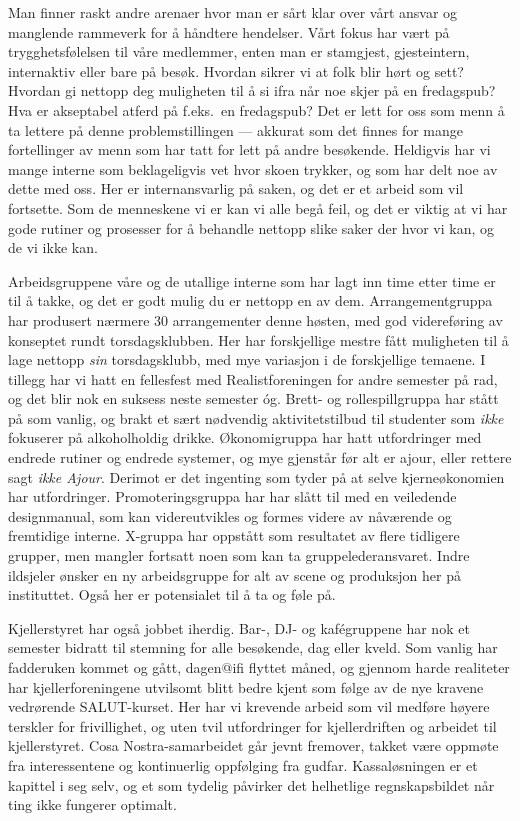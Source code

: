 \documentclass[10pt,norsk,a4paper]{article}
\begin{document}
\begin{multicols}{2}
Man finner raskt andre arenaer hvor man er sårt klar over vårt ansvar og manglende rammeverk for å håndtere hendelser. Vårt fokus har vært på trygghetsfølelsen til våre medlemmer, enten man er stamgjest, gjesteintern, internaktiv eller bare på besøk. Hvordan sikrer vi at folk blir hørt og sett? Hvordan gi nettopp deg muligheten til å si ifra når noe skjer på en fredagspub? Hva er akseptabel atferd på f.eks.\ en fredagspub? Det er lett for oss som menn å ta lettere på denne problemstillingen --- akkurat som det finnes for mange fortellinger av menn som har tatt for lett på andre besøkende. Heldigvis har vi mange interne som beklageligvis vet hvor skoen trykker, og som har delt noe av dette med oss. Her er internansvarlig på saken, og det er et arbeid som vil fortsette. Som de menneskene vi er kan vi alle begå feil, og det er viktig at vi har gode rutiner og prosesser for å behandle nettopp slike saker der hvor vi kan, og de vi ikke kan.

Arbeidsgruppene våre og de utallige interne som har lagt inn time etter time er til å takke, og det er godt mulig du er nettopp en av dem. Arrangementgruppa har produsert nærmere 30 arrangementer denne høsten, med god videreføring av konseptet rundt torsdagsklubben. Her har forskjellige mestre fått muligheten til å lage nettopp \textit{sin} torsdagsklubb, med mye variasjon i de forskjellige temaene. I tillegg har vi hatt en fellesfest med Realistforeningen for andre semester på rad, og det blir nok en suksess neste semester óg. Brett- og rollespillgruppa har stått på som vanlig, og brakt et sært nødvendig aktivitetstilbud til studenter som \textit{ikke} fokuserer på alkoholholdig drikke. Økonomigruppa har hatt utfordringer med endrede rutiner og endrede systemer, og mye gjenstår før alt er ajour, eller rettere sagt \textit{ikke Ajour}. Derimot er det ingenting som tyder på at selve kjerneøkonomien har utfordringer. Promoteringsgruppa har har slått til med en veiledende designmanual, som kan videreutvikles og formes videre av nåværende og fremtidige interne. X-gruppa har oppstått som resultatet av flere tidligere grupper, men mangler fortsatt noen som kan ta gruppelederansvaret. Indre ildsjeler ønsker en ny arbeidsgruppe for alt av scene og produksjon her på instituttet. Også her er potensialet til å ta og føle på.

Kjellerstyret har også jobbet iherdig. Bar-, DJ- og kafégruppene har nok et semester bidratt til stemning for alle besøkende, dag eller kveld. Som vanlig har fadderuken kommet og gått, dagen@ifi flyttet måned, og gjennom harde realiteter har kjellerforeningene utvilsomt blitt bedre kjent som følge av de nye kravene vedrørende SALUT-kurset. Her har vi krevende arbeid som vil medføre høyere terskler for frivillighet, og uten tvil utfordringer for kjellerdriften og arbeidet til kjellerstyret. Cosa Nostra-samarbeidet går jevnt fremover, takket være oppmøte fra interessentene og kontinuerlig oppfølging fra gudfar. Kassaløsningen er et kapittel i seg selv, og et som tydelig påvirker det helhetlige regnskapsbildet når ting ikke fungerer optimalt.


\end{multicols}
\end{document}
